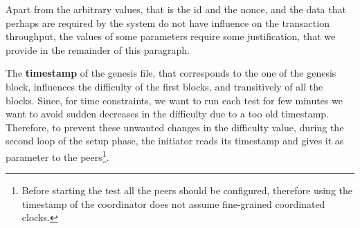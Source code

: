 \begin{figure}[H]
    
\end{figure}


Apart from the arbitrary values, that is the id and the nonce, and the data
that perhaps are required by the system do not have influence on the transaction
throughput, the values of some parameters require some justification, that we 
provide in the remainder of this paragraph.

The \textbf{timestamp} of the genesis file, that corresponds to the one of the
genesis block, influences the difficulty of the first blocks, and transitively
of all the blocks. Since, for time constraints, we want to run each test for few
minutes we want to avoid sudden decreases in the difficulty due to a too old
timestamp. Therefore, to prevent these unwanted changes in the difficulty value,
during the second loop of the setup phase, the initiator reads its timestamp and
gives it as parameter to the peers\footnote{Before starting the test all the
peers should be configured, therefore using the timestamp of the coordinator
does not assume fine-grained coordinated clocks.}.


